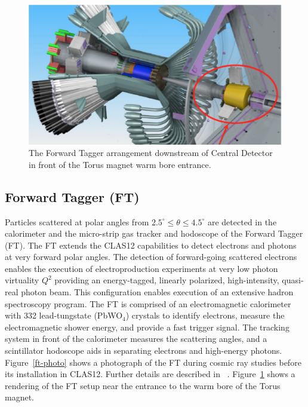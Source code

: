 \documentclass[final,3p,times,twocolumn,authoryear]{elsarticle}
\begin{document}
\begin{figure}[htbp!]
\centerline{\includegraphics[width=1.0\columnwidth]{CD-FT.png}}
\caption{ \rm The Forward Tagger arrangement downstream of Central Detector in front of the Torus magnet warm bore entrance.}
\label{ft}
\end{figure}


\subsection{\rm Forward Tagger (FT)}
Particles scattered at polar angles from $2.5^\circ \le \theta \le 4.5^\circ $ are detected in the calorimeter and the micro-strip gas tracker and hodoscope of the Forward Tagger (FT). The FT extends the CLAS12 capabilities to detect 
electrons and photons at very forward polar angles. The detection of forward-going scattered electrons 
enables the execution of electroproduction experiments at very low photon virtuality $Q^2$ providing an energy-tagged, linearly polarized, high-intensity, quasi-real photon beam. This configuration enables execution of an extensive hadron spectroscopy program. The FT is comprised of an electromagnetic calorimeter with 332 lead-tungstate (PbWO$_4$) crystals to identify electrons,  measure the electromagnetic shower energy, and provide a fast trigger signal. The tracking system in front of the calorimeter  measures the scattering angles, and a scintillator hodoscope aids in separating electrons and high-energy photons. 
Figure~\ref{ft-photo} shows a photograph of the FT during cosmic ray studies before its installation in CLAS12. Further details are described in ~\cite{FT}. Figure~\ref{ft} shows a rendering of the FT setup near the entrance 
to the warm bore of the Torus magnet.   
\end{document}
